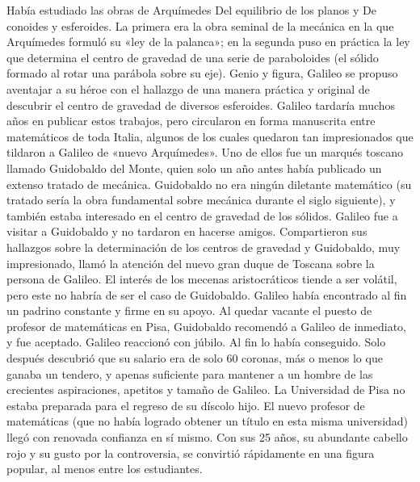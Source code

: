 \documentclass[letterpaper, 10pt, journal]{IEEEtran}
\begin{document}
Había estudiado las obras de Arquímedes Del equilibrio de los planos y De conoides y esferoides. La primera era la obra seminal de la mecánica en la que Arquímedes formuló su «ley de la palanca»; en la segunda puso en práctica la ley que determina el centro de gravedad de una serie de paraboloides (el sólido formado al rotar una parábola sobre su eje). Genio y figura, Galileo se propuso aventajar a su héroe con el hallazgo de una manera práctica y original de descubrir el centro de gravedad de diversos esferoides. Galileo tardaría muchos años en publicar estos trabajos, pero circularon en forma manuscrita entre matemáticos de toda Italia, algunos de los cuales quedaron tan impresionados que tildaron a Galileo de «nuevo Arquímedes». Uno de ellos fue un marqués toscano llamado Guidobaldo del Monte, quien solo un año antes había publicado un extenso tratado de mecánica. Guidobaldo no era ningún diletante matemático (su tratado sería la obra fundamental sobre mecánica durante el siglo siguiente), y también estaba interesado en el centro de gravedad de los sólidos. Galileo fue a visitar a Guidobaldo y no tardaron en hacerse amigos. Compartieron sus hallazgos sobre la determinación de los centros de gravedad y Guidobaldo, muy impresionado, llamó la atención del nuevo gran duque de Toscana sobre la persona de Galileo.\cite{[2]}
\newline
El interés de los mecenas aristocráticos tiende a ser volátil, pero este no habría de ser el caso de Guidobaldo. Galileo había encontrado al fin un padrino constante y firme en su apoyo. Al quedar vacante el puesto de profesor de matemáticas en Pisa, Guidobaldo recomendó a Galileo de inmediato, y fue aceptado. Galileo reaccionó con júbilo. Al fin lo había conseguido. Solo después descubrió que su salario era de solo 60 coronas, más o menos lo que ganaba un tendero, y apenas suficiente para mantener a un hombre de las crecientes aspiraciones, apetitos y tamaño de Galileo. \cite{[2]}
\newline
La Universidad de Pisa no estaba preparada para el regreso de su díscolo hijo. El nuevo profesor de matemáticas (que no había logrado obtener un título en esta misma universidad) llegó con renovada confianza en sí mismo. Con sus 25 años, su abundante cabello rojo y su gusto por la controversia, se convirtió rápidamente en una figura popular, al menos entre los estudiantes.\cite{[2]}
\end{document}
